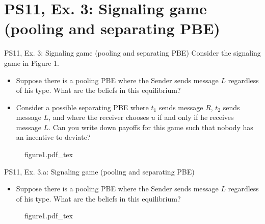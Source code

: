 \section{PS11, Ex. 3: Signaling game (pooling and separating PBE)}

\begin{frame}{PS11, Ex. 3: Signaling game (pooling and separating PBE)}
    Consider the signaling game in Figure 1.
    \begin{itemize}
      \item[(a)] Suppose there is a pooling PBE where the Sender sends message $L$ regardless of his type. What are the beliefs in this equilibrium?
      \item[(b)] Consider a possible separating PBE where $t_1$ sends message $R$, $t_2$ sends message $L$, and where the receiver chooses $u$ if and only if he receives message $L$. Can you write down payoffs for this game such that nobody has an incentive to deviate?
    \end{itemize} \vspace{-8pt}
    \begin{multicols}{2}
      \vfill\null\columnbreak
      \begin{figure}[!h]
        \center
        \def\svgwidth{\columnwidth}
        {figure1.pdf_tex}
      \end{figure}
      \vfill\null \columnbreak
      \vfill
    \end{multicols}
\end{frame}


\begin{frame}{PS11, Ex. 3.a: Signaling game (pooling and separating PBE)}
  \begin{itemize}
    \item[(a)] Suppose there is a pooling PBE where the Sender sends message $L$ regardless of his type. What are the beliefs in this equilibrium?
  \end{itemize} \vspace{-8pt}
  \begin{multicols}{2}
    \vfill\null\columnbreak
    \begin{figure}[!h]
      \center
      \def\svgwidth{\columnwidth}
      {figure1.pdf_tex}
    \end{figure}
    \vfill\null \columnbreak
    \vfill
  \end{multicols}
\end{frame}


